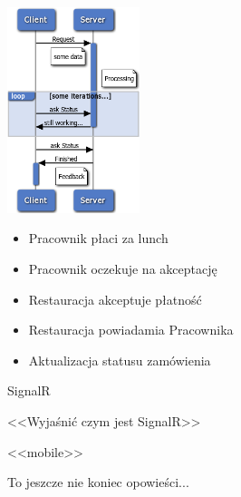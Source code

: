 \documentclass{beamer}
\begin{document}
\begin{frame}{}
	\begin{center}
		\includegraphics[height=6cm]{async2.png}
	\end{center}
\end{frame}

\begin{frame}{}
	\begin{Large}
		\begin{itemize}[<+->]
			\item Pracownik płaci za lunch
			\item Pracownik oczekuje na akceptację
			\item Restauracja akceptuje płatność
			\item Restauracja powiadamia Pracownika
			\item Aktualizacja statusu zamówienia
		\end{itemize}
	\end{Large}
\end{frame}

\begin{frame}{}
	\begin{center}
		\Huge{SignalR}
	\end{center}
\end{frame}

\begin{frame}{}
	\begin{center}
		\Huge{<<Wyjaśnić czym jest SignalR>>}
	\end{center}
\end{frame}

\begin{frame}{}
	\begin{center}
		\Huge{<<mobile>>}
	\end{center}
\end{frame}

\begin{frame}{}
	\begin{center}
		\Huge{To jeszcze nie koniec opowieści...}
	\end{center}
\end{frame}
\end{document}
